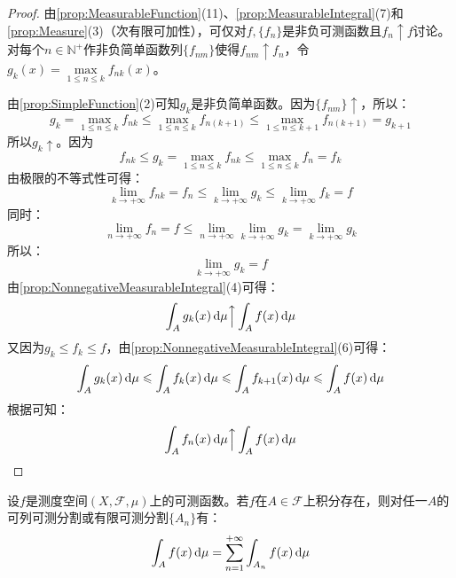 \begin{proof}
	由\cref{prop:MeasurableFunction}(11)、\cref{prop:MeasurableIntegral}(7)和\cref{prop:Measure}(3)（次有限可加性），可仅对$f,\{f_n\}$是非负可测函数且$f_n\uparrow f$讨论。对每个$n\in\mathbb{N}^+$作非负简单函数列$\{f_{nm}\}$使得$f_{nm}\uparrow f_n$，令$g_k(x)=\max\limits_{1\leqslant n\leqslant k}f_{nk}(x)$。\par
	由\cref{prop:SimpleFunction}(2)可知$g_k$是非负简单函数。因为$\{f_{nm}\}\uparrow$，所以：
	\begin{equation*}
		g_k=\max_{1\leqslant n\leqslant k}f_{nk}\leqslant\max_{1\leqslant n\leqslant k}f_{n(k+1)}\leqslant\max_{1\leqslant n\leqslant k+1}f_{n(k+1)}=g_{k+1}
	\end{equation*}
	所以$g_k\uparrow$。因为
	\begin{equation*}
		f_{nk}\leqslant g_k=\max_{1\leqslant n\leqslant k}f_{nk}\leqslant\max_{1\leqslant n\leqslant k}f_n=f_k
	\end{equation*}
	由极限的不等式性可得：
	\begin{equation*}
		\lim_{k\to+\infty}f_{nk}=f_n\leqslant\lim_{k\to+\infty}g_k\leqslant\lim_{k\to+\infty}f_k=f
	\end{equation*}
	同时：
	\begin{equation*}
		\lim_{n\to+\infty}f_n=f\leqslant\lim_{n\to+\infty}\lim_{k\to+\infty}g_k=\lim_{k\to+\infty}g_k
	\end{equation*}
	所以：
	\begin{equation*}
		\lim_{k\to+\infty}g_k=f
	\end{equation*}
	由\cref{prop:NonnegativeMeasurableIntegral}(4)可得：
	\begin{equation*}
		\int_{A}g_k(x)\mathop{}\!\mathrm{d}\mu\Big\uparrow\int_{A}f(x)\mathop{}\!\mathrm{d}\mu
	\end{equation*}
	又因为$g_k\leqslant f_k\leqslant f$，由\cref{prop:NonnegativeMeasurableIntegral}(6)可得：
	\begin{equation*}
		\int_{A}g_k(x)\mathop{}\!\mathrm{d}\mu\leqslant\int_{A}f_k(x)\mathop{}\!\mathrm{d}\mu\leqslant\int_{A}f_{k+1}(x)\mathop{}\!\mathrm{d}\mu\leqslant\int_{A}f(x)\mathop{}\!\mathrm{d}\mu
	\end{equation*}
	根据可知：
	\begin{equation*}
		\int_{A}f_n(x)\mathop{}\!\mathrm{d}\mu\Big\uparrow\int_{A}f(x)\mathop{}\!\mathrm{d}\mu\qedhere
	\end{equation*}
\end{proof}
\begin{theorem}\label{theo:MeasurableCountableIntegral}
	设$f$是测度空间$(X,\mathscr{F},\mu)$上的可测函数。若$f$在$A\in\mathscr{F}$上积分存在，则对任一$A$的可列可测分割或有限可测分割$\{A_n\}$有：
	\begin{equation*}
		\int_{A}f(x)\mathop{}\!\mathrm{d}\mu=\sum_{n=1}^{+\infty}\int_{A_n}f(x)\mathop{}\!\mathrm{d}\mu
	\end{equation*}
\end{theorem}
